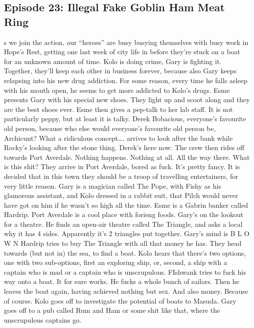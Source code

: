 \subsection{Episode 23: Illegal Fake Goblin Ham Meat Ring}
s we join the action, our “heroes” are busy busying themselves with busy work in Hope’s Rest, getting one last week of city life in before they’re stuck on a boat for an unknown amount of time.\medskip
Kolo is doing crime, Gary is fighting it. Together, they’ll keep each other in business forever, because also Gary keeps relapsing into his new drug addiction. For some reason, every time he falls asleep with his mouth open, he seems to get more addicted to Kolo’s drugs.\medskip
Esme presents Gary with his special new shoes. They light up and scoot along and they are the best shoes ever.\medskip
Esme then gives a pep-talk to her lab staff. It is not particularly peppy, but at least it is talky.\medskip
Derek Bobacious, everyone’s favourite old person, because who else would everyone’s favourite old person be, Archicunt? What a ridiculous concept…. arrives to look after the bank while Rocky’s looking after the stone thing. Derek’s here now.\medskip
The crew then rides off towards Port Averdale. Nothing happens. Nothing at all. All the way there. What is this shit?\medskip
They arrive in Port Averdale, bored as fuck.\medskip
It’s pretty fancy.\medskip
It is decided that in this town they should be a troop of travelling entertainers, for very little reason. Gary is a magician called The Pope, with Fishy as his glamorous assistant, and Kolo dressed in a rabbit suit, that Pilch would never have got on him if he wasn’t so high all the time.\medskip
Esme is a Gabrin banker called Hardrip.\medskip
Port Averdale is a cool place with forieng foods.\medskip
Gary’s on the lookout for a theatre. He finds an open-air theatre called The Triangle, and asks a local why it has 4 sides. Apparently it’s 2 triangles put together. Gary’s mind is\medskip
B L O W N\medskip
Hardrip tries to buy The Triangle with all that money he has.\medskip
They head towards (but not in) the sea, to find a boat.\medskip
Kolo hears that there’s two options, one with two sub-options, first an exploring ship, or, second, a ship with a captain who is mad or a captain who is unscrupulous.\medskip
FIshwank tries to fuck his way onto a boat. It for sure works. He fucks a whole bunch of sailors. Then he leaves the boat again, having achieved nothing but sex. And also money. Because of course.\medskip
Kolo goes off to investigate the potential of boats to Masuda. Gary goes off to a pub called Rum and Ham or some shit like that, where the unscrupulous captains go.\medskip
